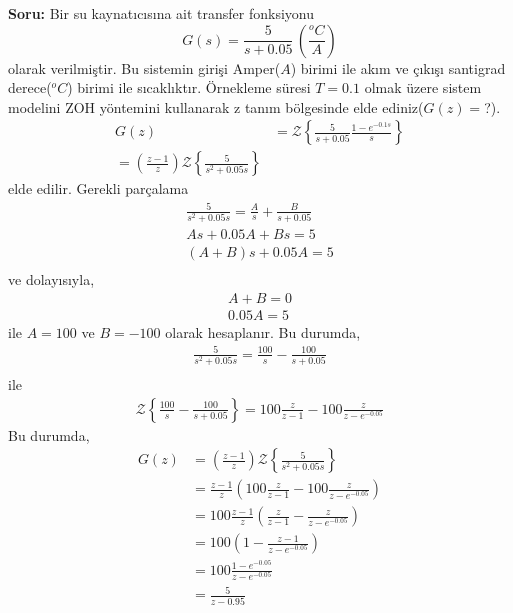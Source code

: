 \noindent\textbf{Soru:}  Bir su kaynatıcısına ait transfer fonksiyonu
\begin{equation}
    G(s)=\frac{5}{s+0.05}\,\left(\frac{^oC}{A}\right)
\end{equation}
olarak verilmiştir. Bu sistemin girişi Amper($A$) birimi ile akım ve çıkışı santigrad derece($^oC$) birimi ile sıcaklıktır. Örnekleme süresi $T=0.1$ olmak üzere sistem modelini ZOH yöntemini kullanarak z tanım bölgesinde elde ediniz($G(z)=$?).
\begin{equation}
\begin{split}
    G(z)&=\mathcal{Z}\left\{
        \frac{5}{s+0.05}\frac{1-e^{-0.1s}}{s}
    \right\}\\
    =\left(\frac{z-1}{z}\right)\mathcal{Z}\left\{
        \frac{5}{s^2+0.05s}
    \right\}
\end{split}
\end{equation}
elde edilir. Gerekli parçalama 
\begin{equation}
    \begin{split}
        \frac{5}{s^2+0.05s}=\frac{A}{s}+\frac{B}{s+0.05}\\
        As+0.05A+Bs=5\\
        (A+B)s+0.05A=5\\
    \end{split}
\end{equation}
ve dolayısıyla,
\begin{equation}
    \begin{split}
        A+B=0\\
        0.05A=5
    \end{split}
\end{equation}
ile $A=100$ ve $B=-100$ olarak hesaplanır. Bu durumda,
\begin{equation}
    \begin{split}
        \frac{5}{s^2+0.05s}=\frac{100}{s}-\frac{100}{s+0.05}\\
    \end{split}
\end{equation}
ile 
\begin{equation}
    \begin{split}
        \mathcal{Z}\left\{\frac{100}{s}-\frac{100}{s+0.05}\right\}=100\frac{z}{z-1}-100\frac{z}{z-e^{-0.05}}
    \end{split}
\end{equation}
Bu durumda,
\begin{equation}
    \begin{split}
        G(z)&=\left(\frac{z-1}{z}\right)\mathcal{Z}\left\{
            \frac{5}{s^2+0.05s}\right\}\\
            &=\frac{z-1}{z}\left(100\frac{z}{z-1}-100\frac{z}{z-e^{-0.05}}\right)\\
            &=100\frac{z-1}{z}\left(\frac{z}{z-1}-\frac{z}{z-e^{-0.05}}\right)\\
            &=100\left(1-\frac{z-1}{z-e^{-0.05}}\right)\\
            &=100\frac{1-e^{-0.05}}{z-e^{-0.05}}\\
            &=\frac{5}{z-0.95}
    \end{split}
\end{equation}
